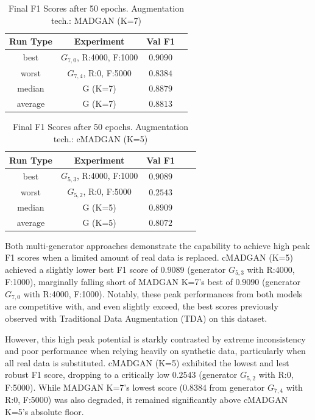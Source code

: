 \begin{table}[H]
	\vspace{-1.5em}
	\centering
	\begin{tabular}{|c|c|c|c|}
		\hline
		Run Type & Experiment & Val F1 \\ \hline
		best & \(G_{7, 0}\), R:4000, F:1000 & $0.9090$\\ \hline
		worst & \(G_{7, 4}\), R:0, F:5000 & $0.8384$\\ \hline
		median & G (K=7) & $0.8879$\\ \hline
		average & G (K=7) & $0.8813$
		\\ \hline
	\end{tabular}
    \caption{Final F1 Scores after 50 epochs. Augmentation tech.: MADGAN (K=7)}
        \label{tab:res_replacement_fashion_cmadgan_vs_madgan__madgan}
\end{table}
\begin{table}[H]
	\centering
	\vspace{-1.5em}
	\begin{tabular}{|c|c|c|c|c|}
		\hline
		Run Type & Experiment & Val F1 \\ \hline
		best & \(G_{5, 3}\), R:4000, F:1000 & $0.9089$\\ \hline
		worst & \(G_{5, 2}\), R:0, F:5000 & $0.2543$\\ \hline
		median & G (K=5) & $0.8909$\\ \hline
		average & G (K=5) & $0.8072$
		\\ \hline
	\end{tabular}
    \caption{Final F1 Scores after 50 epochs. Augmentation tech.: cMADGAN (K=5)}
        \label{tab:res_replacement_fashion_cmadgan_vs_madgan__cmadgan}
\end{table}

\newpage

Both multi-generator approaches demonstrate the capability to achieve high peak F1 scores when a limited amount of real data is replaced. cMADGAN (K=5) achieved a slightly lower best F1 score of $0.9089$ (generator \(G_{5,3}\) with R:4000, F:1000), marginally falling short of MADGAN K=7's best of $0.9090$ (generator \(G_{7,0}\) with R:4000, F:1000). Notably, these peak performances from both models are competitive with, and even slightly exceed, the best scores previously observed with Traditional Data Augmentation (TDA) on this dataset.

However, this high peak potential is starkly contrasted by extreme inconsistency and poor performance when relying heavily on synthetic data, particularly when all real data is substituted. cMADGAN (K=5) exhibited the lowest and lest robust F1 score, dropping to a critically low $0.2543$ (generator \(G_{5,2}\) with R:0, F:5000). While MADGAN K=7's lowest score ($0.8384$ from generator \(G_{7,4}\) with R:0, F:5000) was also degraded, it remained significantly above cMADGAN K=5's absolute floor.

